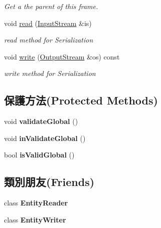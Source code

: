 \begin{DoxyCompactItemize}
\begin{DoxyCompactList}\small\item\em Get a the parent of this frame. \end{DoxyCompactList}\item 
void \hyperlink{class_i_dream_sky_1_1_frame3_a5b55d9b9364953e903f6863efe16541a}{read} (\hyperlink{class_i_dream_sky_1_1_input_stream}{Input\+Stream} \&is)
\begin{DoxyCompactList}\small\item\em read method for Serialization \end{DoxyCompactList}\item 
void \hyperlink{class_i_dream_sky_1_1_frame3_ab0ae20eaa0b37da4370279231c3479bf}{write} (\hyperlink{class_i_dream_sky_1_1_output_stream}{Output\+Stream} \&os) const 
\begin{DoxyCompactList}\small\item\em write method for Serialization \end{DoxyCompactList}\end{DoxyCompactItemize}
\subsection*{保護方法(Protected Methods)}
\begin{DoxyCompactItemize}
\item 
void {\bfseries validate\+Global} ()\hypertarget{class_i_dream_sky_1_1_frame3_a2f139c2613158b8c3010ea7d181b62e0}{}\label{class_i_dream_sky_1_1_frame3_a2f139c2613158b8c3010ea7d181b62e0}

\item 
void {\bfseries in\+Validate\+Global} ()\hypertarget{class_i_dream_sky_1_1_frame3_a5500537ed5f813c27730120d0e34f321}{}\label{class_i_dream_sky_1_1_frame3_a5500537ed5f813c27730120d0e34f321}

\item 
bool {\bfseries is\+Valid\+Global} ()\hypertarget{class_i_dream_sky_1_1_frame3_ab4fcebc1760d6c27be78d9135e59322e}{}\label{class_i_dream_sky_1_1_frame3_ab4fcebc1760d6c27be78d9135e59322e}

\end{DoxyCompactItemize}
\subsection*{類別朋友(Friends)}
\begin{DoxyCompactItemize}
\item 
class {\bfseries Entity\+Reader}\hypertarget{class_i_dream_sky_1_1_frame3_a56e67fba8094d0ad6c4e9a70157aeea0}{}\label{class_i_dream_sky_1_1_frame3_a56e67fba8094d0ad6c4e9a70157aeea0}

\item 
class {\bfseries Entity\+Writer}\hypertarget{class_i_dream_sky_1_1_frame3_a2530bdf39e07c94e0f4b49472a0ac288}{}\label{class_i_dream_sky_1_1_frame3_a2530bdf39e07c94e0f4b49472a0ac288}

\end{DoxyCompactItemize}


